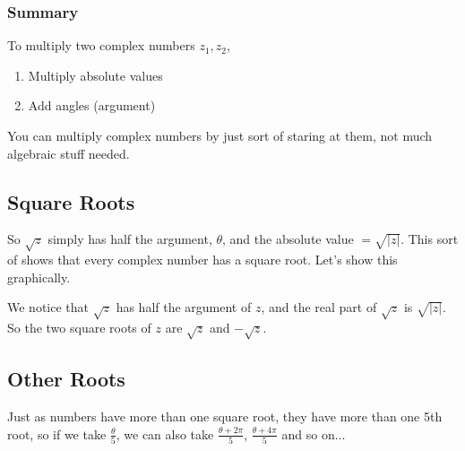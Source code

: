 \documentclass{article}
\begin{document}
\subsubsection{Summary}
To multiply two complex numbers $z_1, z_2$,
\begin{enumerate}
	\item Multiply absolute values
	\item Add angles (argument)
\end{enumerate}
You can multiply complex numbers by just sort of staring at them, not much algebraic stuff needed.

\subsection{Square Roots}
So $\sqrt{z}$ simply has half the argument, $\theta$, and the absolute value $= \sqrt{|z|}$. This sort
of shows that every complex number has a square root. Let's show this graphically.

\begin{center}
\end{center}
We notice that $\sqrt{z}$ has half the argument of $z$, and the real part
of $\sqrt{z}$ is $\sqrt{|z|}$. So the two square roots of $z$ are
$\sqrt{z}$ and $-\sqrt{z}$.

\subsection{Other Roots}
Just as numbers have more than one square root, they have more than
one 5th root, so if we take $\frac{\theta}{5}$, we can also take $\frac{\theta + 2\pi}{5}$,
$\frac{\theta+4\pi}{5}$ and so on...
\end{document}

